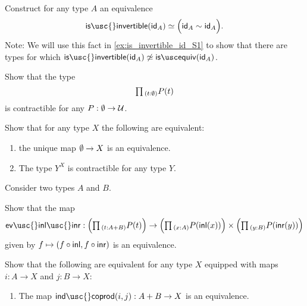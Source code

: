 \begin{exercises}
\item \label{ex:idfunc_autohtpy}Construct for any type $A$ an equivalence
\begin{equation*}
\eqv{\mathsf{is\usc{}invertible}(\idfunc[A])}{\Big(\idfunc[A]\htpy\idfunc[A]\Big)}.
\end{equation*}
Note: We will use this fact in \cref{ex:is_invertible_id_S1} to show that there
are types for which $\mathsf{is\usc{}invertible}(\idfunc[A])\not\eqvsym\isequiv(\idfunc[A])$.
\item 
\begin{subexenum}
\item Show that the type
\begin{equation*}
\prd{t:\emptyt}P(t)
\end{equation*}
is contractible for any $P:\emptyset\to \mathcal{U}$.
\item Show that for any type $X$ the following are equivalent:
  \begin{enumerate}
  \item the unique map $\emptyset \to X$ is an equivalence.
  \item The type $Y^X$ is contractible for any type $Y$.
  \end{enumerate}
\end{subexenum}
\item Consider two types $A$ and $B$.
\begin{subexenum}
\item Show that the map
\begin{equation*}
  \mathsf{ev\usc{}inl\usc{}inr}: \Big(\prd{t:A+B}P(t)\Big) \to
  \Big(\prd{x:A}P(\inl(x))\Big)\times\Big(\prd{y:B}P(\inr(y))\Big)
\end{equation*}
given by $f\mapsto (f\circ{\mathsf{inl}},f\circ{\mathsf{inr}})$ is an equivalence.
\item Show that the following are equivalent for any type $X$ equipped with maps $i:A\to X$ and $j:B\to X$:
  \begin{enumerate}
  \item The map $\mathsf{ind\usc{}coprod}(i,j) :A+B\to X$ is an equivalence.

\end{enumerate}
\end{subexenum}
\end{exercises}
